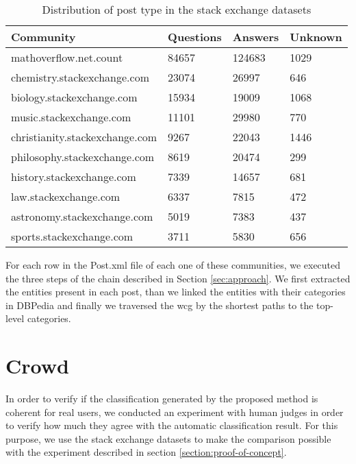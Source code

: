 \begin{table}[H]
\centering
\caption{Distribution of post type in the stack exchange datasets}
\label{tab:stackdist}
\begin{tabular}{@{}llll@{}}
\toprule
Community                            & Questions & Answers & Unknown \\ \midrule
mathoverflow.net.count               & 84657     & 124683  & 1029    \\
chemistry.stackexchange.com    & 23074     & 26997   & 646     \\
biology.stackexchange.com      & 15934     & 19009   & 1068    \\
music.stackexchange.com        & 11101     & 29980   & 770     \\
christianity.stackexchange.com & 9267      & 22043   & 1446    \\
philosophy.stackexchange.com   & 8619      & 20474   & 299     \\
history.stackexchange.com      & 7339      & 14657   & 681     \\
law.stackexchange.com          & 6337      & 7815    & 472     \\
astronomy.stackexchange.com    & 5019      & 7383    & 437     \\
sports.stackexchange.com       & 3711      & 5830    & 656     \\ \bottomrule
\end{tabular}%

\end{table}


For each row in the Post.xml file of each one of these communities, we executed the three steps of the chain described in Section \ref{sec:approach}. We first extracted the entities present in each post, than we linked the entities with their categories in DBPedia and finally we traversed the \gls{wcg} by the shortest paths to the top-level categories. 





\section{\hspace*{3pt} Crowd}

In order to verify if the classification generated by the proposed method is coherent for real users, we conducted an experiment with human judges in order to verify how much they agree with the automatic classification result. For this purpose, we use the stack exchange datasets to make the comparison possible with the experiment described in section \ref{section:proof-of-concept}.



